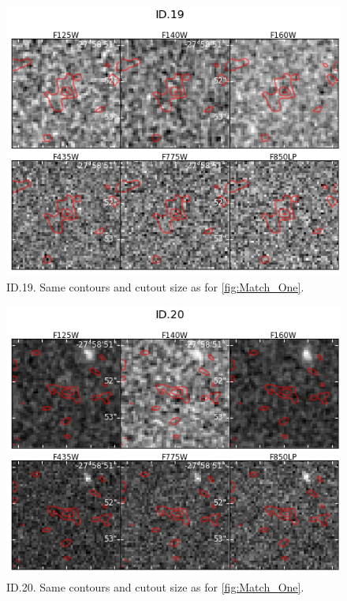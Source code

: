 \begin{figure}[tbp]
\centering \includegraphics[width=160mm]{Matched/ASPECS_Cutout_18.jpg}
\caption{ID.19. Same contours and cutout size as for \ref{fig:Match_One}.}
\label{fig:Match_Three}
\end{figure}

\begin{figure}[tbp]
\centering \includegraphics[width=160mm]{Matched/ASPECS_Cutout_19.jpg}
\caption{ID.20. Same contours and cutout size as for \ref{fig:Match_One}.}
\label{fig:Match_Three}
\end{figure}

